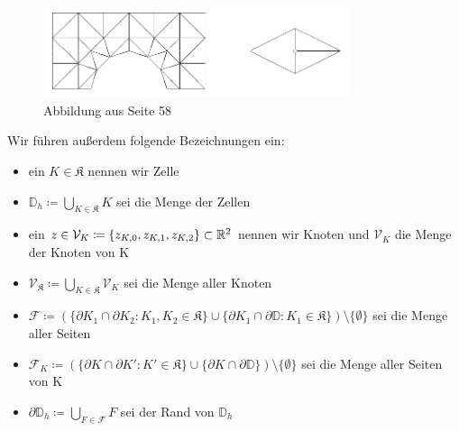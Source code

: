 \begin{figure}[h]
	\centering
	\includegraphics[width=0.8\textwidth]{triangulierung.png} \\
	Abbildung aus \cite{braess2013finite} Seite 58
\end{figure}
Wir führen außerdem folgende Bezeichnungen ein:
\begin{itemize}
	\item ein $ K \in \mathfrak{K} $ nennen wir Zelle
	\item $ \mathbb{D}_h \coloneqq \bigcup_{K \in \mathfrak{K}} K $ sei die Menge der Zellen
	\item ein $ z \in \mathcal{V}_K \coloneqq \{ z_{K,0} , z_{K,1} , z_{K,2}\} \subset \mathbb{R}^2 $ nennen wir Knoten und $\mathcal{V}_K$ die Menge der Knoten von K
	\item $ \mathcal{V}_{\mathfrak{K}} \coloneqq \bigcup_{K \in \mathfrak{K}} \mathcal{V}_K $ sei die Menge aller Knoten
	\item $\mathcal{F}  \coloneqq (\{ \partial K_1 \cap \partial K_2 : K_1,K_2 \in \mathfrak{K} \} \cup \{ \partial K_1 \cap \partial \mathbb{D} : K_1 \in \mathfrak{K} \}) \setminus \{\emptyset\} $ sei die Menge aller Seiten
	\item $ \mathcal{F}_K \coloneqq (\{ \partial K \cap \partial K' : K' \in \mathfrak{K} \} \cup \{ \partial K \cap \partial \mathbb{D} \}) \setminus \{ \emptyset \} $ sei die Menge aller Seiten von K 
	\item $ \partial \mathbb{D}_h \coloneqq \bigcup_{F \in \mathcal{F}} F $ sei der Rand von $ \mathbb{D}_h $
\end{itemize}

